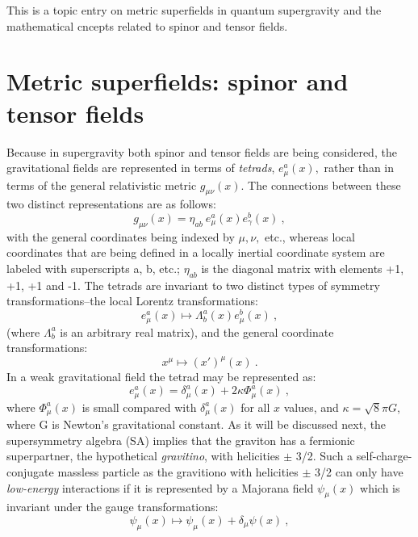 \documentclass[12pt]{article}
\theoremstyle{plain}
\theoremstyle{definition}
\theoremstyle{plain}
\numberwithin{equation}{section}
\begin{document}
This is a topic entry on metric superfields in quantum supergravity
and the mathematical cncepts related to spinor and tensor fields.


\section {Metric superfields: spinor and tensor fields}

 Because in supergravity both spinor and tensor fields are being
considered, the gravitational fields are represented in terms of
\emph{tetrads}, $e^a_\mu(x),$ rather than in terms of the general
relativistic metric $g_{\mu \nu}(x)$. The connections between
these two distinct representations are as follows:
\begin{equation}
g_{\mu\nu}(x)=\eta_{ab}~ e^a_\mu (x)e^b_\gamma(x)~,
\end{equation}
with the general coordinates being indexed by $\mu,\nu,$ etc.,
whereas local coordinates that are being defined in a locally
inertial coordinate system are labeled with superscripts a, b,
etc.;   $ \eta_{ab}$ is the diagonal matrix with elements +1, +1,
+1 and -1. The tetrads are invariant to two distinct types of
symmetry transformations--the local Lorentz transformations:
\begin{equation}
e^a_\mu (x)\longmapsto \Lambda^a_b (x) e^b_\mu (x)~,
\end{equation}
(where $\Lambda^a_b$ is an arbitrary real matrix), and the general
coordinate transformations:
\begin{equation}
x^\mu \longmapsto (x')^\mu(x) ~.
\end{equation}
In a weak gravitational field the tetrad may be represented as:
\begin{equation}
e^a_\mu (x)=\delta^a_\mu(x)+ 2\kappa \Phi^a_\mu (x)~,
\end{equation}
where $\Phi^a_\mu(x)$ is small compared with $\delta^a_\mu(x)$ for
all $x$ values, and $\kappa= \surd 8\pi G$, where G is Newton's
gravitational constant. As it will be discussed next, the
supersymmetry algebra (SA) implies that the graviton has a
fermionic superpartner, the hypothetical \emph{gravitino}, with
helicities $\pm$ 3/2. Such a self-charge-conjugate massless
particle as the gravitiono with helicities $\pm$ 3/2 can only have
\emph{low-energy} interactions if it is represented by a Majorana
field $\psi _\mu(x)$ which is invariant under the gauge
transformations:
\begin{equation}
\psi _\mu(x)\longmapsto \psi _\mu(x)+\delta _\mu \psi(x) ~,
\end{equation}
\end{document}
